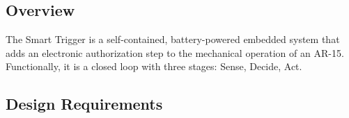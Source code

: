\subsection{Overview}
The Smart Trigger is a self-contained, battery-powered embedded system that
adds an electronic authorization step to the mechanical operation of an AR-15.
Functionally, it is a closed loop with three stages: Sense, Decide, Act.

\subsection{Design Requirements}
